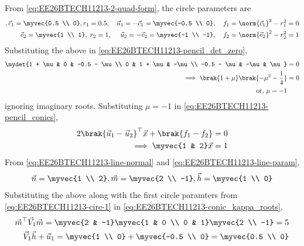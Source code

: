 \begin{enumerate}[label=\thesubsection.\arabic*, ref=\thesubsection.\theenumi,itemsep=0pt]
\solution
From \eqref{eq:EE26BTECH11213-2-quad-form}, the circle parameters are
\begin{align}
\label{eq:EE26BTECH11213-circ-1}, 
 \vec{c}_1 = \myvec{0.5 \\ 0},  r_1 = 0.5, 
 \quad \vec{u}_1 = -\vec{c}_1 = \myvec{-0.5 \\ 0}, \quad f_1 = \norm{\vec{c}_1}^2 - r_1^2 = 0 \\
 \vec{c}_2 = \myvec{1 \\ 1}, \; r_2 = 1, \; 
 \quad \vec{u}_2 = -\vec{c}_2 = \myvec{-1 \\ -1}, \quad f_2 = \norm{\vec{c}_2}^2 - r_2^2 = 1
\end{align}
Substituting the above in 
\eqref{eq:EE26BTECH11213-pencil_det_zero}, 
\begin{align}
\mydet{1 + \mu & 0 & -0.5 - \mu \\
0 & 1 + \mu & -\mu \\
-0.5 - \mu & -\mu & \mu} &= 0
\\
\implies \brak{1 + \mu}\brak{-\mu^2 - \frac{1}{4}} &= 0
\\
\text{or, }
\mu = -1
\end{align}
ignoring imaginary roots.
Substituting $\mu = -1$ in \eqref{eq:EE26BTECH11213-pencil_conics},
\begin{align}
2\brak{\vec{u}_1 - \vec{u}_2}^\top \vec{x} + \brak{f_1 - f_2} &= 0 \\
 \implies \myvec{1 & 2}\vec{x} &= 1
\end{align}
From 
\eqref{eq:EE26BTECH11213-line-normal}
and
\eqref{eq:EE26BTECH11213-line-param},
\begin{align}
\vec{n} = \myvec{1 \\ 2},
\vec{m} = \myvec{2 \\ -1}, \vec{h} = \myvec{1 \\ 0}
\end{align}
Substituting
the above 
along with the first circle paramters from
\eqref{eq:EE26BTECH11213-circ-1} 
in 
\eqref{eq:EE26BTECH11213-conic_kappa_roots},
\begin{align}
\vec{m}^\top \vec{V}_1 \vec{m} = \myvec{2 & -1}\myvec{1 & 0 \\ 0 & 1}\myvec{2 \\ -1} = 5 \\
\vec{V}_1 \vec{h} + \vec{u}_1 = \myvec{1 \\ 0} + \myvec{-0.5 \\ 0} = \myvec{0.5 \\ 0} \\

\end{align}
\end{enumerate}
